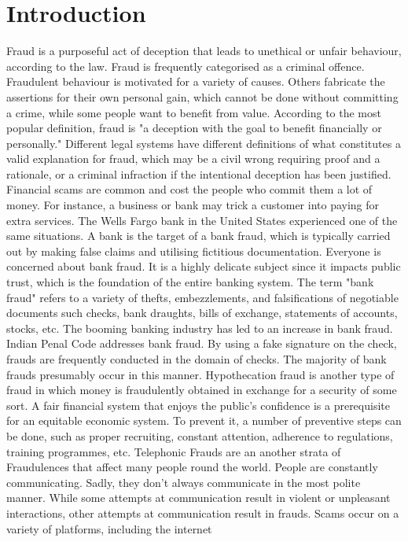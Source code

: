 \documentclass[sn-mathphys]{sn-jnl}%
\theoremstyle{thmstyleone}%
\theoremstyle{thmstyletwo}%
\theoremstyle{thmstylethree}%
\begin{document}



\maketitle          %
%
\section{Introduction}
Fraud is a purposeful act of deception that leads to unethical or unfair behaviour, according to the law. Fraud is frequently categorised as a criminal offence. Fraudulent behaviour is motivated for a variety of causes. Others fabricate the assertions for their own personal gain, which cannot be done without committing a crime, while some people want to benefit from value.  According to the most popular definition, fraud is "a deception with the goal to benefit financially or personally." Different legal systems have different definitions of what constitutes a valid explanation for fraud, which may be a civil wrong requiring proof and a rationale, or a criminal infraction if the intentional deception has been justified. Financial scams are common and cost the people who commit them a lot of money. For instance, a business or bank may trick a customer into paying for extra services. The Wells Fargo bank in the United States experienced one of the same situations. A bank is the target of a bank fraud, which is typically carried out by making false claims and utilising fictitious documentation. Everyone is concerned about bank fraud. It is a highly delicate subject since it impacts public trust, which is the foundation of the entire banking system. The term "bank fraud" refers to a variety of thefts, embezzlements, and falsifications of negotiable documents such checks, bank draughts, bills of exchange, statements of accounts, stocks, etc. The booming banking industry has led to an increase in bank fraud. Indian Penal Code addresses bank fraud. By using a fake signature on the check, frauds are frequently conducted in the domain of checks. The majority of bank frauds presumably occur in this manner. Hypothecation fraud is another type of fraud in which money is fraudulently obtained in exchange for a security of some sort. A fair financial system that enjoys the public's confidence is a prerequisite for an equitable economic system. To prevent it, a number of preventive steps can be done, such as proper recruiting, constant attention, adherence to regulations, training programmes, etc. Telephonic Frauds are an another strata of Fraudulences that affect many people round the world. People are constantly communicating. Sadly, they don't always communicate in the most polite manner. While some attempts at communication result in violent or unpleasant interactions, other attempts at communication result in frauds. Scams occur on a variety of platforms, including the internet 
\end{document}
